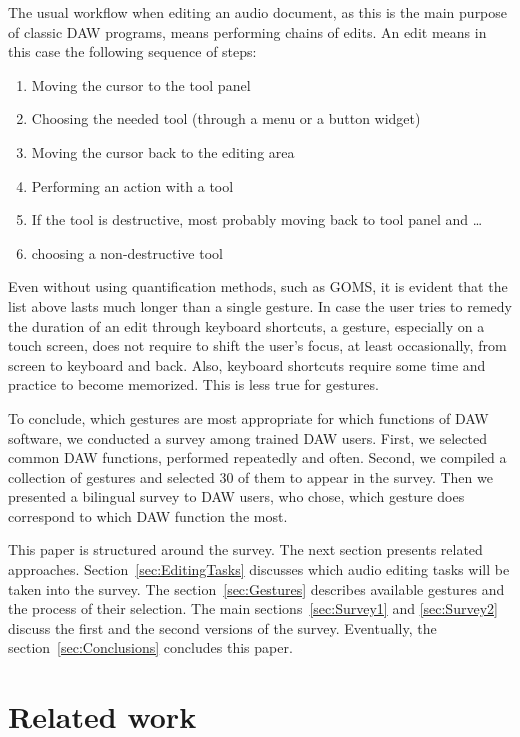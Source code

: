 \documentclass{aes130}
\begin{document}
The usual workflow when editing an audio document, as this is the main purpose of classic DAW programs, means
performing chains of edits. An edit means in this case the following sequence of steps:

\begin{enumerate}
\item Moving the cursor to the tool panel
\item Choosing the needed tool (through a menu or a button widget)
\item Moving the cursor back to the editing area
\item Performing an action with a tool
\item If the tool is destructive, most probably moving back to tool panel and \ldots
\item choosing a non-destructive tool
\end{enumerate}

Even without using quantification methods, such as GOMS\cite{Card:1983:PHI:578027}, it is evident
that the list above lasts much longer than a single gesture. In case the user tries to remedy the duration
of an edit through keyboard shortcuts, a gesture, especially on a touch screen, does not require to shift the user's
focus, at least occasionally, from screen to keyboard and back. Also, keyboard shortcuts require some time
and practice to become memorized. This is less true for gestures\cite{Appert:2009:USC:1518701.1519052}.

To conclude, which gestures are most appropriate for which functions of DAW software, we conducted
a survey among trained DAW users. First, we selected common DAW functions, performed repeatedly and often.
Second, we compiled a collection of gestures and selected 30 of them to appear in the survey. Then
we presented a bilingual survey to DAW users, who chose, which gesture does correspond to which DAW function
the most.

This paper is structured around the survey. The next section presents related approaches.
Section~\ref{sec:EditingTasks} discusses which audio editing tasks will be taken into the survey.
The section~\ref{sec:Gestures} describes available gestures and the process of their selection.
The main sections~\ref{sec:Survey1} and \ref{sec:Survey2} discuss the first and the second versions of the survey.
Eventually, the section~\ref{sec:Conclusions} concludes this paper.

\section{Related work}
\end{document}
